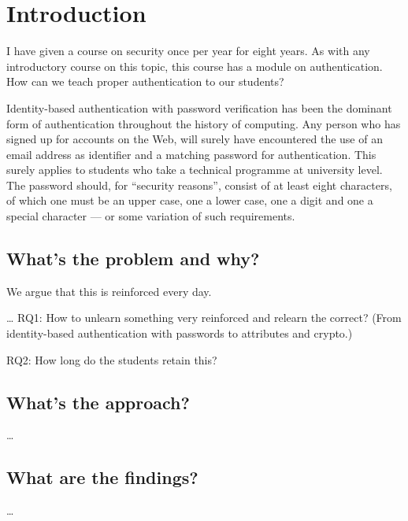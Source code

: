 \section{Introduction}

I have given a course on security once per year for eight years.
As with any introductory course on this topic, this course has a module on 
authentication.
How can we teach proper authentication to our students?

Identity-based authentication with password verification has been the dominant 
form of authentication throughout the history of computing.
Any person who has signed up for accounts on the Web, will surely have 
encountered the use of an email address as identifier and a matching password 
for authentication.
This surely applies to students who take a technical programme at university 
level.
The password should, for \enquote{security reasons}, consist of at least eight 
characters, of which one must be an upper case, one a lower case, one a digit 
and one a special character --- or some variation of such requirements.

\subsection{What's the problem and why?}

We argue that this is reinforced every day.

\dots
RQ1: How to unlearn something very reinforced and relearn the correct? (From 
identity-based authentication with passwords to attributes and crypto.)

RQ2: How long do the students retain this?


\subsection{What's the approach?}

\dots

\subsection{What are the findings?}

\dots

